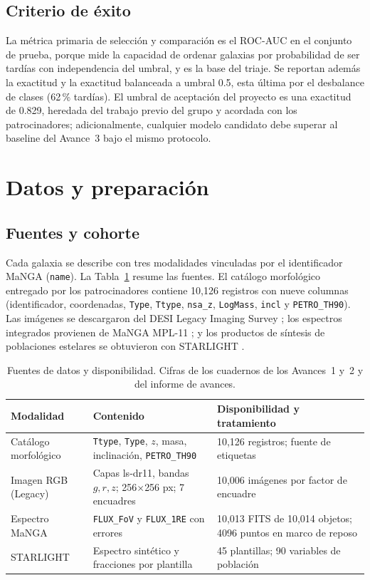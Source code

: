 \documentclass[letterpaper,11pt]{article}
\begin{document}
\subsection{Criterio de éxito}
La métrica primaria de selección y comparación es el ROC-AUC en el conjunto de prueba, porque mide la capacidad de ordenar galaxias por probabilidad de ser tardías con independencia del umbral, y es la base del triaje. Se reportan además la exactitud y la exactitud balanceada a umbral 0.5, esta última por el desbalance de clases (62\,\% tardías). El umbral de aceptación del proyecto es una exactitud de 0.829, heredada del trabajo previo del grupo y acordada con los patrocinadores; adicionalmente, cualquier modelo candidato debe superar al baseline del Avance~3 bajo el mismo protocolo.

\section{Datos y preparación}

\subsection{Fuentes y cohorte}
Cada galaxia se describe con tres modalidades vinculadas por el identificador MaNGA (\texttt{name}). La Tabla~\ref{tab:datos} resume las fuentes. El catálogo morfológico entregado por los patrocinadores contiene 10,126 registros con nueve columnas (identificador, coordenadas, \texttt{Type}, \texttt{Ttype}, \texttt{nsa\_z}, \texttt{LogMass}, \texttt{incl} y \texttt{PETRO\_TH90}). Las imágenes se descargaron del DESI Legacy Imaging Survey \parencite{dey2019}; los espectros integrados provienen de MaNGA MPL-11 \parencite{bundy2015}; y los productos de síntesis de poblaciones estelares se obtuvieron con STARLIGHT \parencite{cidfernandes2005}.

\begin{table}[H]
  \centering
  \caption{Fuentes de datos y disponibilidad. Cifras de los cuadernos de los Avances~1 y~2 y del informe de avances.}
  \label{tab:datos}
  \small
  \begin{tabular}{p{3.2cm}p{5.6cm}p{5.4cm}}
    \toprule
    Modalidad & Contenido & Disponibilidad y tratamiento \\
    \midrule
    Catálogo morfológico & \texttt{Ttype}, \texttt{Type}, $z$, masa, inclinación, \texttt{PETRO\_TH90} & 10,126 registros; fuente de etiquetas \\
    Imagen RGB (Legacy) & Capas ls-dr11, bandas $g,r,z$; 256$\times$256 px; 7 encuadres & 10,006 imágenes por factor de encuadre \\
    Espectro MaNGA & \texttt{FLUX\_FoV} y \texttt{FLUX\_1RE} con errores & 10,013 FITS de 10,014 objetos; 4096 puntos en marco de reposo \\
    STARLIGHT & Espectro sintético y fracciones por plantilla & 45 plantillas; 90 variables de población \\
    \bottomrule
  \end{tabular}
\end{table}
\end{document}
